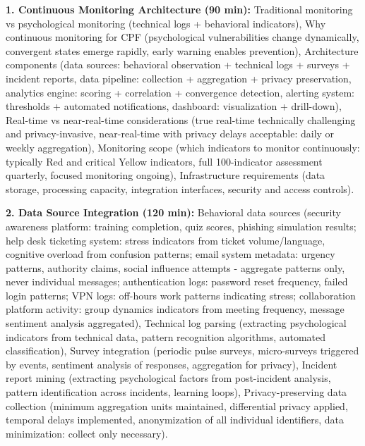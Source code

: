 \documentclass[11pt,a4paper]{article}
\begin{document}
\textbf{1. Continuous Monitoring Architecture (90 min):} Traditional monitoring vs psychological monitoring (technical logs + behavioral indicators), Why continuous monitoring for CPF (psychological vulnerabilities change dynamically, convergent states emerge rapidly, early warning enables prevention), Architecture components (data sources: behavioral observation + technical logs + surveys + incident reports, data pipeline: collection + aggregation + privacy preservation, analytics engine: scoring + correlation + convergence detection, alerting system: thresholds + automated notifications, dashboard: visualization + drill-down), Real-time vs near-real-time considerations (true real-time technically challenging and privacy-invasive, near-real-time with privacy delays acceptable: daily or weekly aggregation), Monitoring scope (which indicators to monitor continuously: typically Red and critical Yellow indicators, full 100-indicator assessment quarterly, focused monitoring ongoing), Infrastructure requirements (data storage, processing capacity, integration interfaces, security and access controls).

\textbf{2. Data Source Integration (120 min):} Behavioral data sources (security awareness platform: training completion, quiz scores, phishing simulation results; help desk ticketing system: stress indicators from ticket volume/language, cognitive overload from confusion patterns; email system metadata: urgency patterns, authority claims, social influence attempts - aggregate patterns only, never individual messages; authentication logs: password reset frequency, failed login patterns; VPN logs: off-hours work patterns indicating stress; collaboration platform activity: group dynamics indicators from meeting frequency, message sentiment analysis aggregated), Technical log parsing (extracting psychological indicators from technical data, pattern recognition algorithms, automated classification), Survey integration (periodic pulse surveys, micro-surveys triggered by events, sentiment analysis of responses, aggregation for privacy), Incident report mining (extracting psychological factors from post-incident analysis, pattern identification across incidents, learning loops), Privacy-preserving data collection (minimum aggregation units maintained, differential privacy applied, temporal delays implemented, anonymization of all individual identifiers, data minimization: collect only necessary).
\end{document}

